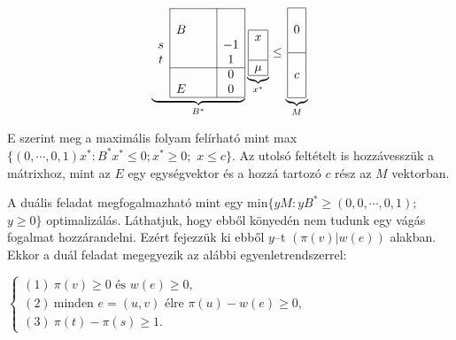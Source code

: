 \vspace{0.4cm}
\begin{wrapfigure}{L}{0.35\textwidth}
\begin{center}
\vspace{-1.3cm}
\begin{displaymath}
\underbrace{
\begin{array}{c|ccc|c|}
\cline{2-5}
&   & & & \\
&  B& & & \\
s &   & & &-1 \\
t &   & & & 1 \\
\cline{2-5}
&   & & & 0 \\
& E & & & 0 \\
\cline{2-5}
\end{array}}_{B^*}
\underbrace{
\begin{array}{|c|}
\hline
x\\
\\
\hline
\mu\\
\hline
\end{array}}_{x^*}
\leq
\underbrace{
\begin{array}{|c|}
\hline
\\
0\\
\\
\hline
\\
c\\
\\
\hline
\end{array}}_{M}
\end{displaymath}
\vspace{-1.3cm}
\end{center}
\end{wrapfigure}
E szerint meg a maximális folyam felírható mint max$\{ (0, \cdots,0,1)x^* : B^*x^* \leq
0; x^* \geq 0;$ $x \leq c \}$. Az utolsó feltételt is hozzávesszük a mátrixhoz,
mint az $E$ egy egységvektor és a hozzá tartozó $c$ rész az $M$ vektorban.

A duális feladat megfogalmazható mint egy min$\{ yM :yB^* \geq (0, 0, \cdots, 0,
1);$ $y \geq 0 \}$ optimalizálás. Láthatjuk, hogy ebből könyedén nem tudunk egy
vágás fogalmat hozzárandelni. Ezért fejezzük ki ebből $y$--t $\left(
\pi\left(v\right) | w\left(e\right)\right)$ alakban. Ekkor a duál feladat
megegyezik az alábbi egyenletrendszerrel:

$\begin{cases}
(1)~\pi(v) \geq 0 \mbox{ és } w(e) \geq 0, \\
(2)~\mbox{minden } e = (u,v) \mbox{ élre }  \pi(u)-w(e) \geq 0, \\
(3)~\pi(t)-\pi(s) \geq 1. \end{cases}$

